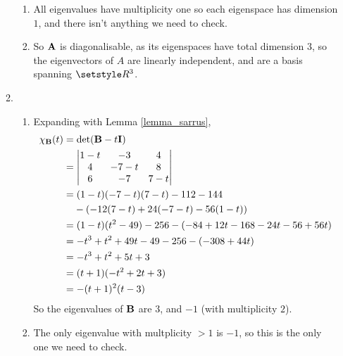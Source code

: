 \documentclass[fleqn,a4paper,11pt]{article}
\begin{document}
\begin{enumerate}[label=\textbf{\arabic*.}]
\begin{enumerate}[label=(\textbf{\Alph*})]
\begin{enumerate}[label=(\roman*)]
      \item
       All eigenvalues have multiplicity one so each eigenspace has dimension
       \(1\), and there isn't anything we need to check.
      \item
       So \(\mathbf{A}\) is diagonalisable, as its eigenspaces have total dimension
       \(3\), so the eigenvectors of \(A\) are linearly independent, and are a
       basis spanning \(\Reals^3\).
     \end{enumerate}
    \item
     \begin{enumerate}[label=(\roman*)]
      \item Expanding with Lemma \ref{lemma_sarrus},
       \begin{align*}
        \chi_{\mat B}(t)
         &= \det(\mat B - t\mat I) \\
         &= \begin{vmatrix}
          1 - t & -3 & 4 \\
          4 & -7 - t & 8 \\
          6 & -7 & 7 - t
         \end{vmatrix} \\
         &= (1 - t)(-7 - t)(7 - t) - 112 - 144 \\
         &\phantom{={}} - (-12(7 - t) + 24(-7 - t) - 56(1 - t)) \\
         &= (1 - t)(t^2 - 49) - 256 - (-84 + 12t - 168 - 24t - 56 + 56t) \\
         &= -t^3 + t^2 + 49t - 49 - 256 - (-308 + 44t) \\
         &= -t^3 + t^2 + 5t + 3 \\
         &= (t + 1)(-t^2 + 2t + 3) \\
         &= -(t + 1)^2(t - 3)
       \end{align*}
       So the eigenvalues of \(\mathbf{B}\) are \(3\), and \(-1\) (with multiplicity
       \(2\)).
      \item
       The only eigenvalue with multplicity \(> 1\) is \(-1\), so this is the
       only one we need to check.


\end{enumerate}
\end{enumerate}
\end{enumerate}
\end{document}
